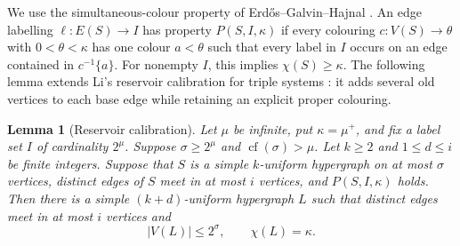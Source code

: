 \documentclass[a4paper,11pt,reqno]{amsart}
\theoremstyle{plain}
\newtheorem{lemma}[theorem]{Lemma}
\theoremstyle{definition}
\theoremstyle{remark}
\begin{document}
We use the simultaneous-colour property of Erd\H{o}s--Galvin--Hajnal
\citep[Definition~6.2, p.~448]{egh1975}.  An edge labelling
$\ell:E(S)\to I$ has property $P(S,I,\kappa)$ if every colouring
$c:V(S)\to\theta$ with $0<\theta<\kappa$ has one colour $a<\theta$
such that every label in $I$ occurs on an edge contained in
$c^{-1}\{a\}$.  For nonempty $I$, this implies $\chi(S)\ge\kappa$.
The following lemma extends Li's reservoir calibration for triple
systems \citep[Section~6]{li2026}: it adds several old vertices to
each base edge while retaining an explicit proper colouring.

\begin{lemma}[Reservoir calibration]
\label{exact-reservoir-step}
Let $\mu$ be infinite, put $\kappa=\mu^+$, and fix a label set $I$
of cardinality $2^\mu$.  Suppose $\sigma\ge2^\mu$ and
$\operatorname{cf}(\sigma)>\mu$.  Let $k\ge2$ and $1\le d\le i$
be finite integers.  Suppose that $S$ is a simple $k$-uniform
hypergraph on at most $\sigma$ vertices, distinct edges of $S$
meet in at most $i$ vertices, and $P(S,I,\kappa)$ holds.
Then there is a simple $(k+d)$-uniform hypergraph $L$ such that
distinct edges meet in at most $i$ vertices and
\[
 |V(L)|\le2^\sigma,\qquad \chi(L)=\kappa.
\]
\end{lemma}
\end{document}
